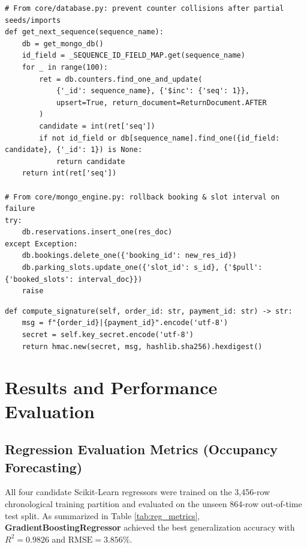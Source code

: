 \documentclass[12pt,a4paper,oneside]{report}
\begin{document}
\begin{lstlisting}[caption={Atomic Counter Collision Guard \& Rollback Safety (\texttt{core/database.py} \& \texttt{core/mongo\_engine.py})},label={lst:rollback}]
# From core/database.py: prevent counter collisions after partial seeds/imports
def get_next_sequence(sequence_name):
    db = get_mongo_db()
    id_field = _SEQUENCE_ID_FIELD_MAP.get(sequence_name)
    for _ in range(100):
        ret = db.counters.find_one_and_update(
            {'_id': sequence_name}, {'$inc': {'seq': 1}},
            upsert=True, return_document=ReturnDocument.AFTER
        )
        candidate = int(ret['seq'])
        if not id_field or db[sequence_name].find_one({id_field: candidate}, {'_id': 1}) is None:
            return candidate
    return int(ret['seq'])

# From core/mongo_engine.py: rollback booking & slot interval on failure
try:
    db.reservations.insert_one(res_doc)
except Exception:
    db.bookings.delete_one({'booking_id': new_res_id})
    db.parking_slots.update_one({'slot_id': s_id}, {'$pull': {'booked_slots': interval_doc}})
    raise
\end{lstlisting}

\begin{lstlisting}[caption={HMAC-SHA256 Razorpay Signature Verification (\texttt{core/payment\_service.py})},label={lst:payment}]
def compute_signature(self, order_id: str, payment_id: str) -> str:
    msg = f"{order_id}|{payment_id}".encode('utf-8')
    secret = self.key_secret.encode('utf-8')
    return hmac.new(secret, msg, hashlib.sha256).hexdigest()
\end{lstlisting}

\chapter{Results and Performance Evaluation}

\section{Regression Evaluation Metrics (Occupancy Forecasting)}
All four candidate Scikit-Learn regressors were trained on the 3,456-row chronological training partition and evaluated on the unseen 864-row out-of-time test split. As summarized in Table \ref{tab:reg_metrics}, \textbf{GradientBoostingRegressor} achieved the best generalization accuracy with $R^2 = 0.9826$ and $\text{RMSE} = 3.856\%$.
\end{document}
